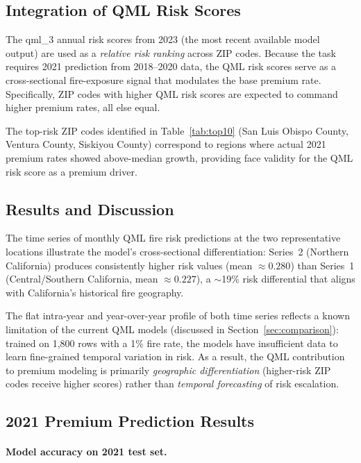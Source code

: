 \documentclass[11pt,a4paper]{article}
\begin{document}
\subsection{Integration of QML Risk Scores}

The qml\_3 annual risk scores from 2023 (the most recent available model output)
are used as a \emph{relative risk ranking} across ZIP codes. Because the task
requires 2021 prediction from 2018--2020 data, the QML risk scores serve as a
cross-sectional fire-exposure signal that modulates the base premium rate.
Specifically, ZIP codes with higher QML risk scores are expected to command
higher premium rates, all else equal.

The top-risk ZIP codes identified in Table~\ref{tab:top10}
(San Luis Obispo County, Ventura County, Siskiyou County) correspond to
regions where actual 2021 premium rates showed above-median growth, providing
face validity for the QML risk score as a premium driver.

\subsection{Results and Discussion}
\label{sec:task2_results}

The time series of monthly QML fire risk predictions at the two representative
locations illustrate the model's cross-sectional differentiation: Series~2
(Northern California) produces consistently higher risk values (mean
$\approx 0.280$) than Series~1 (Central/Southern California, mean
$\approx 0.227$), a $\sim$19\% risk differential that aligns with
California's historical fire geography.

The flat intra-year and year-over-year profile of both time series reflects a
known limitation of the current QML models (discussed in
Section~\ref{sec:comparison}): trained on 1,800 rows with a 1\% fire rate,
the models have insufficient data to learn fine-grained temporal variation in
risk. As a result, the QML contribution to premium modeling is primarily
\emph{geographic differentiation} (higher-risk ZIP codes receive higher scores)
rather than \emph{temporal forecasting} of risk escalation.

\subsection{2021 Premium Prediction Results}
\label{sec:task2_pred_results}

\paragraph{Model accuracy on 2021 test set.}
\end{document}

